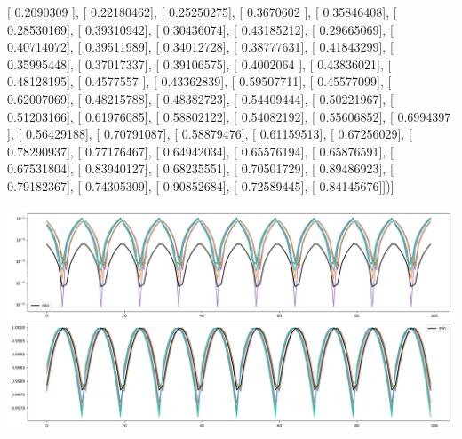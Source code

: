 \documentclass{article}
\begin{document}
       [ 0.2090309 ],
       [ 0.22180462],
       [ 0.25250275],
       [ 0.3670602 ],
       [ 0.35846408],
       [ 0.28530169],
       [ 0.39310942],
       [ 0.30436074],
       [ 0.43185212],
       [ 0.29665069],
       [ 0.40714072],
       [ 0.39511989],
       [ 0.34012728],
       [ 0.38777631],
       [ 0.41843299],
       [ 0.35995448],
       [ 0.37017337],
       [ 0.39106575],
       [ 0.4002064 ],
       [ 0.43836021],
       [ 0.48128195],
       [ 0.4577557 ],
       [ 0.43362839],
       [ 0.59507711],
       [ 0.45577099],
       [ 0.62007069],
       [ 0.48215788],
       [ 0.48382723],
       [ 0.54409444],
       [ 0.50221967],
       [ 0.51203166],
       [ 0.61976085],
       [ 0.58802122],
       [ 0.54082192],
       [ 0.55606852],
       [ 0.6994397 ],
       [ 0.56429188],
       [ 0.70791087],
       [ 0.58879476],
       [ 0.61159513],
       [ 0.67256029],
       [ 0.78290937],
       [ 0.77176467],
       [ 0.64942034],
       [ 0.65576194],
       [ 0.65876591],
       [ 0.67531804],
       [ 0.83940127],
       [ 0.68235551],
       [ 0.70501729],
       [ 0.89486923],
       [ 0.79182367],
       [ 0.74305309],
       [ 0.90852684],
       [ 0.72589445],
       [ 0.84145676]])]
\begin{center}
\includegraphics[scale=.9]{control_dpn_all.png}

\end{center}
\end{document}
